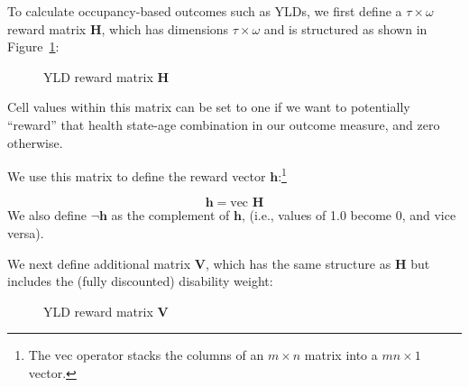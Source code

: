 \documentclass[
]{agujournal2019}
\begin{document}
To calculate occupancy-based outcomes such as YLDs, we first define a
\(\tau \times \omega\) reward matrix \(\mathbf{H}\), which has
dimensions \(\tau \times \omega\) and is structured as shown in
Figure~\ref{fig-H-le}:

\begin{figure}


\caption{\label{fig-H-le}YLD reward matrix \(\mathbf{H}\)}

\end{figure}%

Cell values within this matrix can be set to one if we want to
potentially ``reward'' that health state-age combination in our outcome
measure, and zero otherwise.

We use this matrix to define the reward vector
\(\mathbf{h}\):\footnote{The \(\text{vec}\) operator stacks the columns
  of an \(m \times n\) matrix into a \(mn \times 1\) vector.}

\[
\mathbf{h} = \text{vec } \mathbf{H}
\] We also define \(\neg \mathbf{h}\) as the complement of
\(\mathbf{h}\), (i.e., values of 1.0 become 0, and vice versa).

We next define additional matrix \(\mathbf{V}\), which has the same
structure as \(\mathbf{H}\) but includes the (fully discounted)
disability weight:

\begin{figure}


\caption{\label{fig-H-yld}YLD reward matrix \(\mathbf{V}\)}

\end{figure}%
\end{document}
